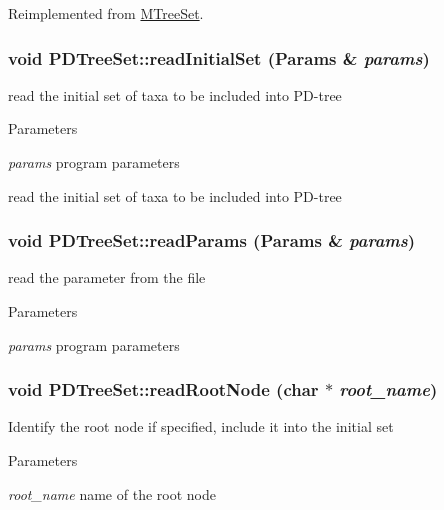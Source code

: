 Reimplemented from \hyperlink{classMTreeSet_a14f065ce54450ea54f3fd8e1cc025103}{MTreeSet}.\hypertarget{classPDTreeSet_a4c5e9cac8a799ad0c2365cfd27dbf153}{
\subsubsection[{readInitialSet}]{\setlength{\rightskip}{0pt plus 5cm}void PDTreeSet::readInitialSet ({\bf Params} \& {\em params})}}
\label{classPDTreeSet_a4c5e9cac8a799ad0c2365cfd27dbf153}
read the initial set of taxa to be included into PD-\/tree 
\begin{DoxyParams}{Parameters}
\item[{\em params}]program parameters\end{DoxyParams}
read the initial set of taxa to be included into PD-\/tree \hypertarget{classPDTreeSet_af2a27a3ed80adb54c44c7cc3f2f43bc1}{
\subsubsection[{readParams}]{\setlength{\rightskip}{0pt plus 5cm}void PDTreeSet::readParams ({\bf Params} \& {\em params})}}
\label{classPDTreeSet_af2a27a3ed80adb54c44c7cc3f2f43bc1}
read the parameter from the file 
\begin{DoxyParams}{Parameters}
\item[{\em params}]program parameters \end{DoxyParams}
\hypertarget{classPDTreeSet_a4ddfd3ac840458f8c73d9b8ff0b03bbc}{
\subsubsection[{readRootNode}]{\setlength{\rightskip}{0pt plus 5cm}void PDTreeSet::readRootNode (char $\ast$ {\em root\_\-name})}}
\label{classPDTreeSet_a4ddfd3ac840458f8c73d9b8ff0b03bbc}
Identify the root node if specified, include it into the initial set 
\begin{DoxyParams}{Parameters}
\item[{\em root\_\-name}]name of the root node \end{DoxyParams}


